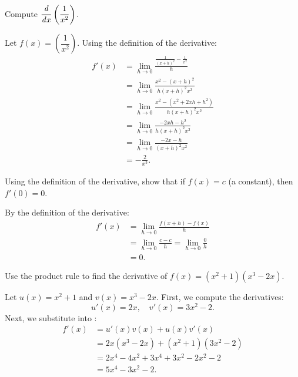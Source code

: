 \begin{problem}
  Compute $\dfrac{\mathit{d} }{\mathit{d} x} \left( \dfrac{1}{x^{2}} \right)$.
  \vspace{\baselineskip}

  Let $f(x) = \left( \dfrac{1}{x^{2}} \right)$. Using the definition of the derivative:
    \begin{align*}
      f'(x) &= \lim_{h \to 0}\frac{\frac{1}{(x+h)^2} - \frac{1}{x^2}}{h}\\
            &= \lim_{h \to 0}\frac{x^2 - (x+h)^2}{h(x+h)^2x^2}\\
            &= \lim_{h \to 0}\frac{x^2 - (x^2 + 2xh + h^2)}{h(x+h)^2x^2}\\
            &= \lim_{h \to 0}\frac{-2xh - h^2}{h(x+h)^2x^2}\\
            &= \lim_{h \to 0}\frac{-2x - h}{(x+h)^2x^2}\\
            &= -\frac{2}{x^3}.
    \end{align*}
\end{problem}

\begin{problem}
  \label{prob:derivative-constant}
  Using the definition of the derivative, show that if $f(x) = c$ (a constant), then $f'(0) = 0$.
  \vspace{\baselineskip}

  By the definition of the derivative:
    \begin{align*}
      f'(x) &= \lim_{h \to 0}\frac{f(x+h)-f(x)}{h}\\
            &= \lim_{h \to 0}\frac{c-c}{h} = \lim_{h \to 0}\frac{0}{h}\\
            &= 0.
    \end{align*}
\end{problem}

\begin{problem}
  Use the product rule to find the derivative of $f(x) = (x^{2} + 1)(x^{3} - 2x)$.
  \vspace{\baselineskip}

  Let $u(x) = x^2 + 1$ and $v(x) = x^3 - 2x$. First, we compute the derivatives:
  \[
    u'(x) = 2x, \quad v'(x) = 3x^2 - 2.
  \]
  Next, we substitute into :
    \begin{align*}
    f'(x) &= u'(x)v(x) + u(x)v'(x)\\
          &= 2x(x^3 - 2x) + (x^2 + 1)(3x^2 - 2)\\
          &= 2x^4 - 4x^2 + 3x^4 + 3x^2 - 2x^2 - 2\\
          &= 5x^4 - 3x^2 - 2.
    \end{align*}
\end{problem}


